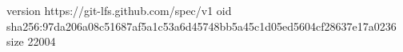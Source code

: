 version https://git-lfs.github.com/spec/v1
oid sha256:97da206a08c51687af5a1c53a6d45748bb5a45c1d05ed5604cf28637e17a0236
size 22004
